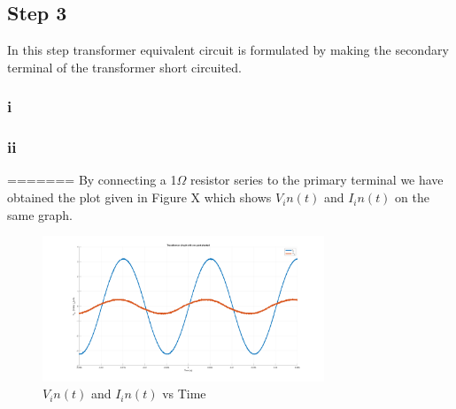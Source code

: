 \documentclass[letterpaper,12pt]{article}
\begin{document}
\subsection{Step 3}
In this step transformer equivalent circuit is formulated by making the secondary terminal of the transformer short circuited.
\subsubsection{i}

\subsubsection{ii}

%
=======
By connecting a 1\(\Omega\) resistor series to the primary terminal we have obtained the plot given in Figure X which shows \(V_in(t) \) and \(I_in(t)\) on the same graph.  
\begin{figure}[H]
    \centering
    \includegraphics[width = 0.75\textwidth]{3_1.png}
    \caption{\(V_in(t) \) and \(I_in(t)\) vs Time }
\end{figure} 
\end{document}
